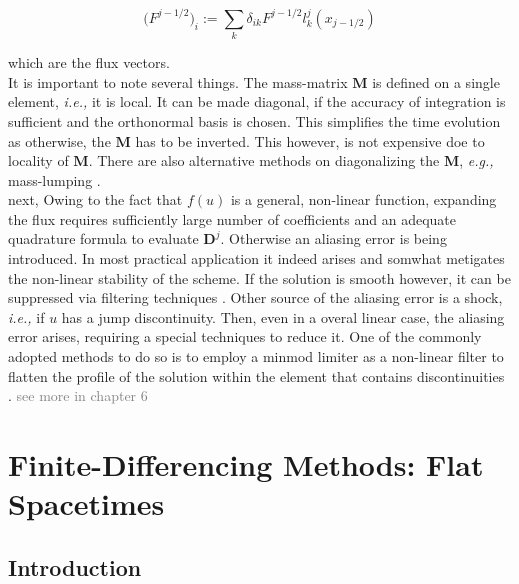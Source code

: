 \documentclass[11pt,a4paper,headinclude=true,DIV=14,BCOR=8mm,chapterprefix,listof=totoc,twoside,openright,abstracton]{scrbook}
\begin{document}
\begin{equation}
    \big(F^{j-1/2}\big)_i := \sum_{k} \delta_{ik} F^{j-1/2}l_{k}^{j}(x_{j-1/2})
\end{equation}

which are the flux vectors.\\

It is important to note several things. The mass-matrix $\boldsymbol{M}$ is defined on a single element, \textit{i.e.,} it is local. It can be made diagonal, if the accuracy of integration is sufficient and the orthonormal basis is chosen. This simplifies the time evolution as otherwise, the $\boldsymbol{M}$ has to be inverted. This however, is not expensive doe to locality of $\boldsymbol{M}$. There are also alternative methods on diagonalizing the $\boldsymbol{M}$, \textit{e.g.,} mass-lumping \cite{Canuto:2008}.  \\

next, Owing to the fact that $f(u)$ is a general, non-linear function, expanding the flux requires sufficiently large number of coefficients and an adequate quadrature formula to evaluate $\boldsymbol{D}^j$. Otherwise an aliasing error is being introduced. In most practical application it indeed arises and somwhat metigates the non-linear stability of the scheme. If the solution is smooth however, it can be suppressed via filtering techniques \cite{Hesthaven:2007}. 
Other source of the aliasing error is a shock, \textit{i.e.,} if $u$ has a jump discontinuity. Then, even in a overal linear case, the aliasing error arises, requiring a special techniques to reduce it. One of the commonly adopted methods to do so is to employ a minmod limiter as a non-linear filter to flatten the profile of the solution within the element that contains discontinuities \cite{Cockburn:2001}. \textcolor{gray}{see more in chapter 6}

\chapter{Finite-Differencing Methods: Flat Spacetimes}

\section{Introduction}
\end{document}
